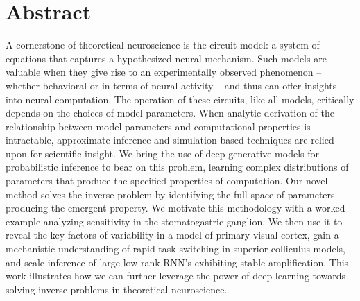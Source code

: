 \documentclass[11pt]{article}
\begin{document}
\section{Abstract}
A cornerstone of theoretical neuroscience is the circuit model: a system of equations that captures a hypothesized neural mechanism.  
Such models are valuable when they give rise to an experimentally observed phenomenon -- whether behavioral or in terms of neural activity -- and thus can offer insights into neural computation.
The operation of these circuits, like all models, critically depends on the choices of model parameters.
When analytic derivation of the relationship between model parameters and computational properties is intractable, approximate inference and simulation-based techniques are relied upon for scientific insight.
We bring the use of deep generative models for probabilistic inference to bear on this problem, learning complex distributions of parameters that produce the specified properties of computation.
Our novel method solves the inverse problem by identifying the full space of parameters producing the emergent property.
We motivate this methodology with a worked example analyzing sensitivity in the stomatogastric ganglion.  
We then use it to reveal the key factors of variability in a model of primary visual cortex, gain a mechanistic understanding of rapid task switching in superior colliculus models, and scale inference of large low-rank RNN's exhibiting stable amplification.
This work illustrates how we can further leverage the power of deep learning towards solving inverse problems in theoretical neuroscience.
\end{document}
